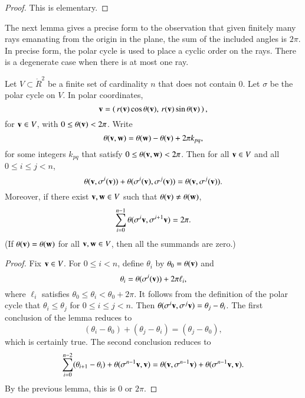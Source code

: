 \begin{proof} This is elementary.
\end{proof}

The next lemma gives a precise form to the observation
that given finitely many rays emanating from the origin
in the plane, the sum of the included angles is $2\pi$.
In precise form, the polar cycle is used to place
a cyclic order on the rays.  There is a degenerate case
when there is at most one ray.


\begin{lemma}[]\label{lemma:polar-sum}
  Let $V\subset\ring{R}^2$ be a finite set of cardinality $n$ that
  does not contain $0$.  Let $\sigma$ be the polar cycle on $V$.  In
  polar coordinates,
\begin{displaymath}
{\mathbf v}=\left(\, r({\mathbf v})\cos\theta({\mathbf v}),\, r({\mathbf v})\sin\theta({\mathbf v})\,\right),
\end{displaymath} 
for ${\mathbf v}\in V$, with
$0\le\theta({\mathbf v})<2\pi$.
Write
\begin{displaymath}
\theta({\mathbf v},{\mathbf w}) = \theta({\mathbf w}) - \theta({\mathbf v}) + 2\pi k_{pq},
\end{displaymath}
for some integers $k_{pq}$ that satisfy $0\le \theta({\mathbf v},{\mathbf w}) < 2\pi$.
Then for all ${\mathbf v}\in V$
and all $0\le i \le j < n$,
\begin{displaymath}
\theta({\mathbf v},\sigma^i({\mathbf v})) +\theta(\sigma^i({\mathbf v}),\sigma^j({\mathbf v})) =
\theta({\mathbf v},\sigma^j({\mathbf v})).
\end{displaymath}
Moreover, if there exist ${\mathbf v},{\mathbf w}\in V$ such that $\theta({\mathbf v})\ne\theta({\mathbf w})$,
\begin{displaymath}
\sum_{i=0}^{n-1} \theta(\sigma^{i}{\mathbf v},\sigma^{i+1} {\mathbf v}) = 2\pi.
\end{displaymath}
(If $\theta({\mathbf v})=\theta({\mathbf w})$ for all ${\mathbf v},{\mathbf w}\in V$, then all the
summands are zero.)
\end{lemma}
%

\begin{proof}
Fix ${\mathbf v}\in V$.
For $0\le i<n$, define $\theta_i$ by
$\theta_0=\theta({\mathbf v})$ and 
\begin{displaymath}\theta_i = \theta(\sigma^i({\mathbf v})) + 2\pi \ell_i,
\end{displaymath}
where  $\ell_i$ satisfies $\theta_0\le \theta_i < \theta_0+2\pi$.
It follows from the definition of the polar cycle that
$\theta_i \le \theta_j$ for $0\le i\le j < n$.  Then
$\theta(\sigma^i {\mathbf v} ,\sigma^j {\mathbf v}) = \theta_j - \theta_i$.
The first conclusion of the lemma reduces to
\begin{displaymath}
(\theta_i-\theta_0) + (\theta_j-\theta_i) = (\theta_j-\theta_0),
\end{displaymath}
which is certainly true.
The second conclusion reduces to
\begin{displaymath}
\sum_{i=0}^{n-2} (\theta_{i+1}-\theta_i) + \theta(\sigma^{n-1}{\mathbf v},{\mathbf v})
= \theta({\mathbf v},\sigma^{n-1}{\mathbf v}) + \theta(\sigma^{n-1}{\mathbf v},{\mathbf v}).
\end{displaymath}
By the previous lemma, this is $0$ or $2\pi$.
\end{proof}


